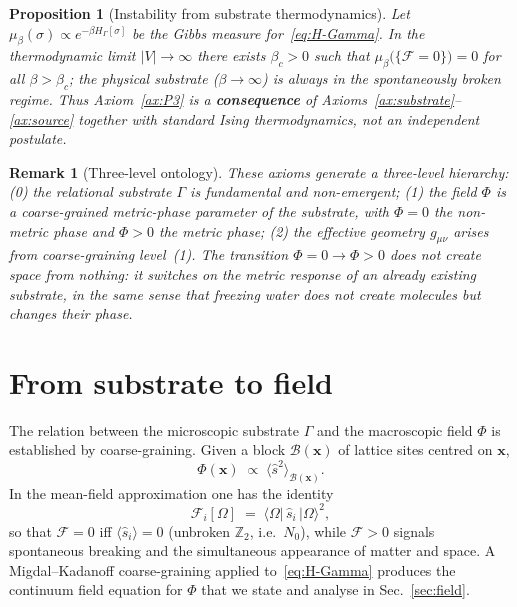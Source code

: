 \documentclass[11pt,a4paper]{article}
\renewcommand{\Phi}{\varPhi}
\newcommand{\Nzero}{N_{0}}
\newcommand{\Ffield}{\mathcal{F}}
\newcommand{\Zp}{\mathbb{Z}_{2}}
\newtheorem{proposition}[axiom]{Proposition}
\newtheorem{remark}[axiom]{Remark}
\begin{document}
\begin{proposition}[Instability from substrate thermodynamics]\label{prop:instability}
Let $\mu_{\beta}(\sigma)\propto e^{-\beta H_{\Gamma}[\sigma]}$ be the Gibbs
measure for~\eqref{eq:H-Gamma}. In the thermodynamic limit $|V|\to\infty$
there exists $\beta_{c}>0$ such that
$\mu_{\beta}\bigl(\{\Ffield=0\}\bigr)=0$ for all $\beta>\beta_{c}$; the
physical substrate ($\beta\to\infty$) is always in the spontaneously
broken regime. Thus Axiom~\ref{ax:P3} is a \textbf{consequence} of
Axioms~\ref{ax:substrate}--\ref{ax:source} together with standard Ising
thermodynamics, not an independent postulate.
\end{proposition}

\begin{remark}[Three-level ontology]
These axioms generate a three-level hierarchy:
(0) the relational substrate $\Gamma$ is fundamental and non-emergent;
(1) the field $\Phi$ is a coarse-grained \emph{metric-phase parameter} of
the substrate, with $\Phi=0$ the non-metric phase and $\Phi>0$ the metric
phase;
(2) the effective geometry $g_{\mu\nu}$ arises from coarse-graining
level~(1). The transition $\Phi=0\to\Phi>0$ does not create space from
nothing: it switches on the metric response of an already existing
substrate, in the same sense that freezing water does not create
molecules but changes their phase.
\end{remark}

\section{From substrate to field}\label{sec:substrate-to-field}

The relation between the microscopic substrate $\Gamma$ and the macroscopic
field $\Phi$ is established by coarse-graining. Given a block
$\mathcal{B}(\mathbf{x})$ of lattice sites centred on $\mathbf{x}$,
\begin{equation}\label{eq:Phi-def}
  \Phi(\mathbf{x})
  \;\propto\;
  \langle\hat{s}^{2}\rangle_{\mathcal{B}(\mathbf{x})}.
\end{equation}
In the mean-field approximation one has the identity
\begin{equation}\label{eq:F-s-relation}
  \Ffield_{i}[\Omega]
  \;=\;\langle\Omega|\,\hat{s}_{i}\,|\Omega\rangle^{2},
\end{equation}
so that $\Ffield=0$ iff $\langle\hat{s}_{i}\rangle=0$ (unbroken $\Zp$,
i.e.\ $\Nzero$), while $\Ffield>0$ signals spontaneous breaking and the
simultaneous appearance of matter and space. A Migdal--Kadanoff
coarse-graining applied to~\eqref{eq:H-Gamma} produces the continuum field
equation for $\Phi$ that we state and analyse in Sec.~\ref{sec:field}.
\end{document}
